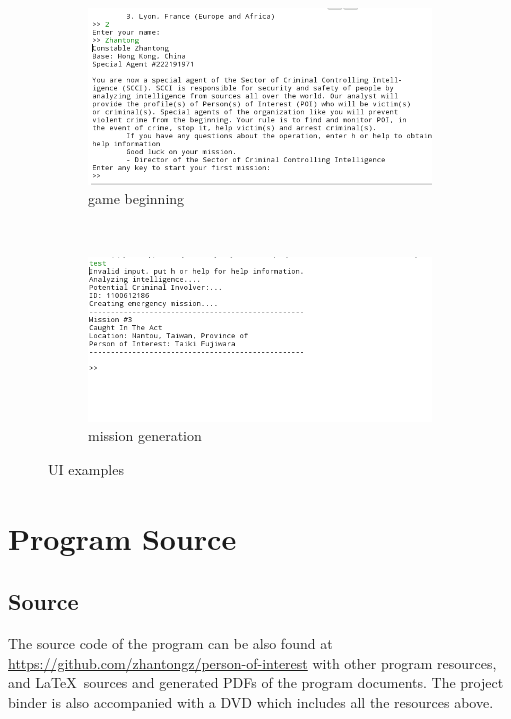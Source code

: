 \documentclass[letterpaper, 12pt]{report}
\begin{document}
\begin{figure}[h]
\begin{subfigure}[b]{0.4\textwidth}
\includegraphics[width=\linewidth]{./img/ui3}
\caption{game beginning}
\end{subfigure}
~
\begin{subfigure}[b]{0.4\textwidth}
\includegraphics[width=\linewidth]{./img/ui4}
\caption{mission generation}
\end{subfigure}
\caption{UI examples}
\end{figure}

\part{Program Source}
\lstset{language=Java, numbers=left, breaklines=true, showstringspaces=false,
basicstyle=\footnotesize\ttfamily, tabsize=2}
\chapter{Source}
The source code of the program can be also found at
\url{https://github.com/zhantongz/person-of-interest} with other program
resources, and \LaTeX\ sources and generated PDFs of the program documents.
The project binder is also accompanied with a DVD which includes all the
resources above.
\end{document}

